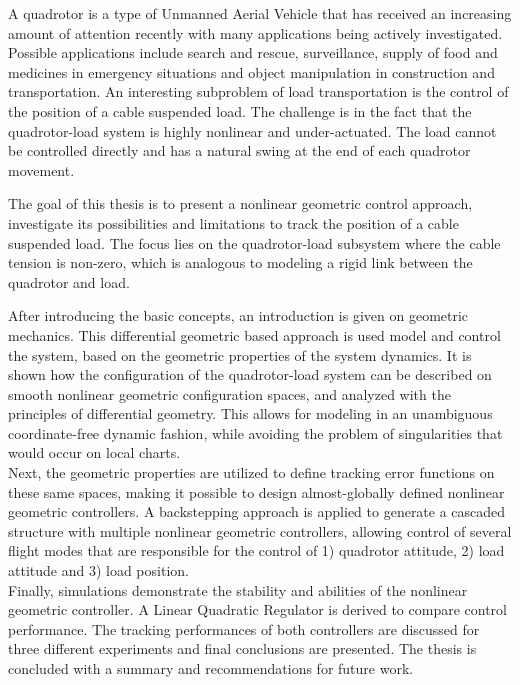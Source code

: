 \vspace{-2cm}
A quadrotor is a type of Unmanned Aerial Vehicle that has received an increasing amount of attention recently with many applications being actively investigated. 
Possible applications include search and rescue, surveillance, supply of food and medicines in emergency situations and object manipulation in construction and transportation.
An interesting subproblem of load transportation is the control of the position of a cable suspended load. The challenge is in the fact that the quadrotor-load system is highly nonlinear and under-actuated. The load cannot be controlled directly and has a natural swing at the end of each quadrotor movement. 

The goal of this thesis is to present a nonlinear geometric control approach, investigate its possibilities and limitations to track the position of a cable suspended load. The focus lies on the quadrotor-load subsystem where the cable tension is non-zero, which is analogous to modeling a rigid link between the quadrotor and load.

After introducing the basic concepts, an introduction is given on geometric mechanics. This differential geometric based approach is used model and control the system, based on the geometric properties of the system dynamics. 
It is shown how the configuration of the quadrotor-load system can be described on smooth nonlinear geometric configuration spaces, and analyzed with the principles of differential geometry. 
This allows for modeling in an unambiguous coordinate-free dynamic fashion, while avoiding the problem of singularities that would occur on local charts. \\
Next, the geometric properties are utilized to define tracking error functions on these same spaces, making it possible to design almost-globally defined nonlinear geometric controllers. A backstepping approach is applied to generate a cascaded structure with multiple nonlinear geometric controllers, allowing control of several flight modes that are responsible for the control of 1) quadrotor attitude, 2) load attitude and 3) load position.\\ 
Finally, simulations demonstrate the stability and abilities of the nonlinear geometric controller. A Linear Quadratic Regulator is derived to compare control performance. The tracking performances of both controllers are discussed for three different experiments and final conclusions are presented. The thesis is concluded with a summary and recommendations for future work.
 

